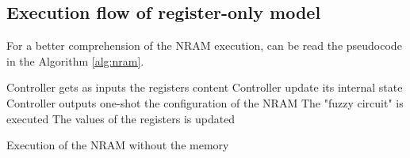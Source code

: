 \subsection{Execution flow of register-only model}\label{subsec:execution-register-only}
For a better comprehension of the NRAM execution, can be read the pseudocode in the Algorithm \ref{alg:nram}.
\begin{algorithm}
	\begin{algorithmic}[1]
		\label{lst:nram:line-5}
			\State Controller gets as inputs the registers content\label{lst:nram:line-6}
				\State Controller update its internal state
			\EndIf
			\State Controller outputs one-shot the configuration of the NRAM 
			\label{lst:nram:line-8}
			\State The "fuzzy circuit" is executed \label{lst:nram:line-9}
			\State The values of the registers is updated\label{lst:nram:line-10}
		\EndFor
	\end{algorithmic}
	\caption{Execution of the NRAM without the memory}\label{alg:nram}
\end{algorithm}

